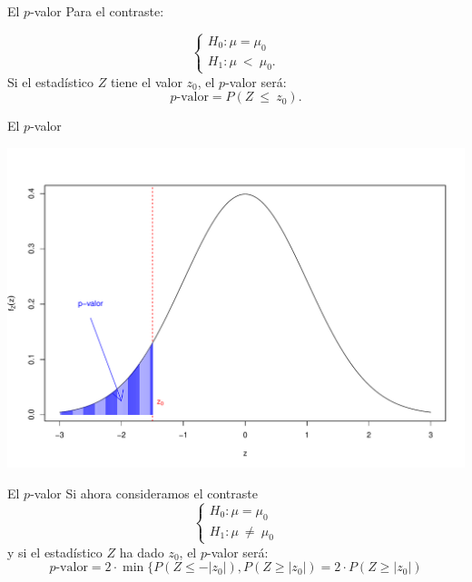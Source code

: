\documentclass[
  ignorenonframetext,
]{beamer}
\begin{document}
\begin{frame}{El \(p\)-valor}
\protect\hypertarget{el-p-valor-2}{}
Para el contraste:

\[
\left\{\begin{array}{l}
H_0:\mu=\mu_0\\ H_1:\mu\ <\ \mu_0.
\end{array}
\right.
\] Si el estadístico \(Z\) tiene el valor \(z_0\), el \(p\)-valor será:
\[
\mbox{$p$-valor}=P(Z\ \leq\ z_0).
\]
\end{frame}

\begin{frame}{El \(p\)-valor}
\protect\hypertarget{el-p-valor-3}{}
\begin{center}\includegraphics{contrastes_dos_muestras_files/figure-beamer/unnamed-chunk-5-1} \end{center}
\end{frame}

\begin{frame}{El \(p\)-valor}
\protect\hypertarget{el-p-valor-4}{}
Si ahora consideramos el contraste \[
\left\{\begin{array}{l}
H_0:\mu=\mu_0\\ H_1:\mu\ \neq\ \mu_0
\end{array}
\right.
\] y si el estadístico \(Z\) ha dado \(z_0\), el \(p\)-valor será: \[
\mbox{$p$-valor}  =2 \cdot \min\{P(Z \leq -|z_0|),P(Z \geq |z_0|)
  =2\cdot P(Z \geq |z_0|)
\]
\end{frame}
\end{document}
